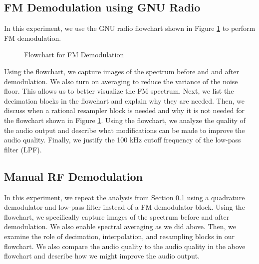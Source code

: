 \documentclass{article}
\begin{document}
\subsection{FM Demodulation using GNU Radio}
\label{section::fm_demod_gnu_radio}

In this experiment, we use the GNU radio flowchart shown in Figure \ref{fig::fm_radio_flowchart} to perform FM demodulation.

\begin{figure}[H]
	\centerline{}
	\caption{Flowchart for FM Demodulation}
	\label{fig::fm_radio_flowchart}
\end{figure}

\noindent Using the flowchart, we capture images of the spectrum before and and after demodulation. We also turn on averaging to reduce the variance of the noise floor. This allows us to better visualize the FM spectrum. Next, we list the decimation blocks in the flowchart and explain why they are needed. Then, we discuss when a rational resampler block is needed and why it is not needed for the flowchart shown in Figure \ref{fig::fm_radio_flowchart}. Using the flowchart, we analyze the quality of the audio output and describe what modifications can be made to improve the audio quality. Finally, we justify the 100 kHz cutoff frequency of the low-pass filter (LPF).

\subsection{Manual RF Demodulation}

In this experiment, we repeat the analysis from Section \ref{section::fm_demod_gnu_radio} using a quadrature demodulator and low-pass filter instead of a FM demodulator block. Using the flowchart, we specifically capture images of the spectrum before and after demodulation. We also enable spectral averaging as we did above. Then, we examine the role of decimation, interpolation, and resampling blocks in our flowchart. We also compare the audio quality to the audio quality in the above flowchart and describe how we might improve the audio output.
\end{document}
